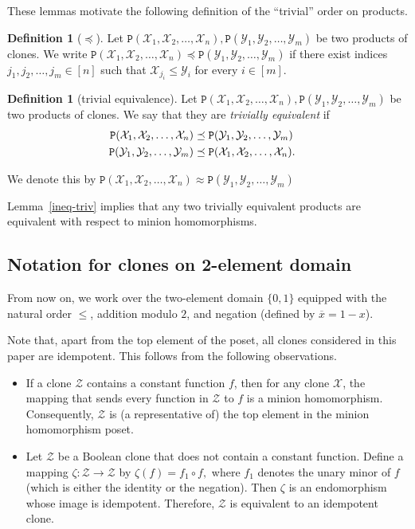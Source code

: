 \documentclass{amsart}
\numberwithin{equation}{section}
\theoremstyle{plain}
\theoremstyle{definition}
\newtheorem{definition}[theorem]{Definition}
\def\clone#1{\mathcal{#1}}
\def\C#1{{\mathtt{P}}(#1)}
\begin{document}
These lemmas motivate the following definition of the ``trivial'' order on products.

\begin{definition}[$\preceq$]
Let $\C{\clone{X}_1,\clone{X}_2,\dots,\clone{X}_n}, \C{\clone{Y}_1,\clone{Y}_2,\dots,\clone{Y}_m}$ be two products of clones. We write $\C{\clone{X}_1,\clone{X}_2,\dots,\clone{X}_n}\preceq \C{\clone{Y}_1,\clone{Y}_2,\dots,\clone{Y}_m}$ if there exist indices $j_1,j_2,\dots,j_m \in [n]$ such that $\clone{X}_{j_i}\leq \clone{Y}_i$ for every $i\in[m]$.
\end{definition}

\begin{definition}[trivial equivalence]
Let $\C{\clone{X}_1,\clone{X}_2,\dots,\clone{X}_n}, \C{\clone{Y}_1,\clone{Y}_2,\dots,\clone{Y}_m}$ be two products of clones. We say that they are {\em trivially equivalent} if
\begin{align}
\C{\clone{X}_1,\clone{X}_2,\dots,\clone{X}_n}&\preceq \C{\clone{Y}_1,\clone{Y}_2,\dots,\clone{Y}_m}\cr
\C{\clone{Y}_1,\clone{Y}_2,\dots,\clone{Y}_m}&\preceq \C{\clone{X}_1,\clone{X}_2,\dots,\clone{X}_n}.
\end{align}

We denote this by $\C{\clone{X}_1,\clone{X}_2,\dots,\clone{X}_n}\approx \C{\clone{Y}_1,\clone{Y}_2,\dots,\clone{Y}_m}$
\end{definition}

Lemma~\ref{ineq-triv} implies that any two trivially equivalent products are equivalent with respect to minion homomorphisms.


\subsection{Notation for clones on 2-element domain}

From now on, we work over the two-element domain $\{0,1\}$ equipped with the natural order $\leq$, addition modulo $2$, and negation (defined by $\overline{x}=1-x$). 

Note that, apart from the top element of the poset, all clones considered in this paper are idempotent. This follows from the following observations.
\begin{itemize}
  \item If a clone $\clone{Z}$ contains a constant function $f$, then for any clone $\clone{X}$, the mapping that sends every function in $\clone{Z}$ to $f$ is a minion homomorphism. Consequently, $\clone{Z}$ is (a representative of) the top element in the minion homomorphism poset.
  \item Let $\clone{Z}$ be a Boolean clone that does not contain a constant function. Define a mapping $\zeta:\clone{Z}\to\clone{Z}$  by $\zeta(f) = f_1\circ f,$ where $f_1$ denotes the unary minor of $f$ (which is either the identity or the negation). Then $\zeta$ is an endomorphism whose image is idempotent. Therefore, $\clone{Z}$ is equivalent to an idempotent clone.  
\end{itemize}
\end{document}
